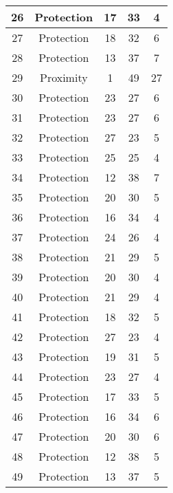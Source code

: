 \documentclass[results.tex]{subfiles}
\begin{document}
\begin{center}
\begin{tabular}{| c || c | c | c | c |}
    \hline
    26 & Protection & 17 & 33 & 4 \\ 
    \hline
    27 & Protection & 18 & 32 & 6 \\ 
    \hline
    28 & Protection & 13 & 37 & 7 \\ 
    \hline
    29 & Proximity & 1 & 49 & 27 \\ 
    \hline
    30 & Protection & 23 & 27 & 6 \\ 
    \hline
    31 & Protection & 23 & 27 & 6 \\ 
    \hline
    32 & Protection & 27 & 23 & 5 \\ 
    \hline
    33 & Protection & 25 & 25 & 4 \\ 
    \hline
    34 & Protection & 12 & 38 & 7 \\ 
    \hline
    35 & Protection & 20 & 30 & 5 \\ 
    \hline
    36 & Protection & 16 & 34 & 4 \\ 
    \hline
    37 & Protection & 24 & 26 & 4 \\ 
    \hline
    38 & Protection & 21 & 29 & 5 \\ 
    \hline
    39 & Protection & 20 & 30 & 4 \\ 
    \hline
    40 & Protection & 21 & 29 & 4 \\ 
    \hline
    41 & Protection & 18 & 32 & 5 \\ 
    \hline
    42 & Protection & 27 & 23 & 4 \\ 
    \hline
    43 & Protection & 19 & 31 & 5 \\ 
    \hline
    44 & Protection & 23 & 27 & 4 \\ 
    \hline
    45 & Protection & 17 & 33 & 5 \\ 
    \hline
    46 & Protection & 16 & 34 & 6 \\ 
    \hline
    47 & Protection & 20 & 30 & 6 \\ 
    \hline
    48 & Protection & 12 & 38 & 5 \\ 
    \hline
    49 & Protection & 13 & 37 & 5 \\ 
    \hline   \end{tabular}
\end{center}
\end{document}
